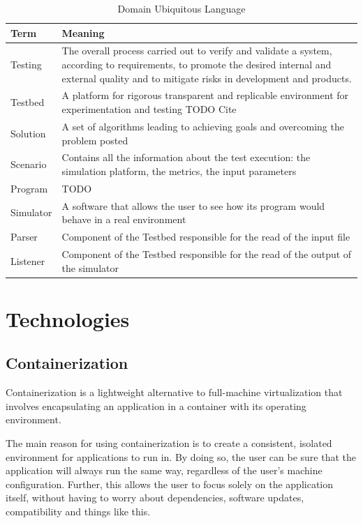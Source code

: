 \documentclass[12pt,a4paper,openright,twoside]{book}
\begin{document}
\begin{table}[h]
    \centering
    \begin{tabular}{|l|p{}|}
    \toprule
    \textbf{Term} & \textbf{Meaning} \\
    \midrule                                                                                                                                                              
    Testing & The overall process carried out to verify and validate a system, according to requirements, to promote the desired internal and external quality and to mitigate risks in development and products. \\ \hline
    Testbed & A platform for rigorous transparent and replicable environment for experimentation and testing TODO Cite \\ \hline
    Solution & A set of algorithms leading to achieving goals and overcoming the problem posted \\ \hline
    Scenario & Contains all the information about the test execution: the simulation platform, the metrics, the input parameters \\ \hline
    Program & TODO \\ \hline
    Simulator & A software that allows the user to see how its program would behave in a real environment \\ \hline
    Parser & Component of the Testbed responsible for the read of the input file \\ \hline
    Listener & Component of the Testbed responsible for the read of the output of the simulator \\ \hline
    \end{tabular}
    \caption{Domain Ubiquitous Language}
    \end{table}

\section{Technologies}

\subsection{Containerization}

Containerization is a lightweight alternative to full-machine virtualization that involves encapsulating an application in a container with its operating environment.

The main reason for using containerization is to create a consistent, isolated environment for applications to run in.
By doing so, the user can be sure that the application will always run the same way, regardless of the user's machine configuration. 
Further, this allows the user to focus solely on the application itself, without having to worry about dependencies, software updates, compatibility and things like this.
\end{document}
